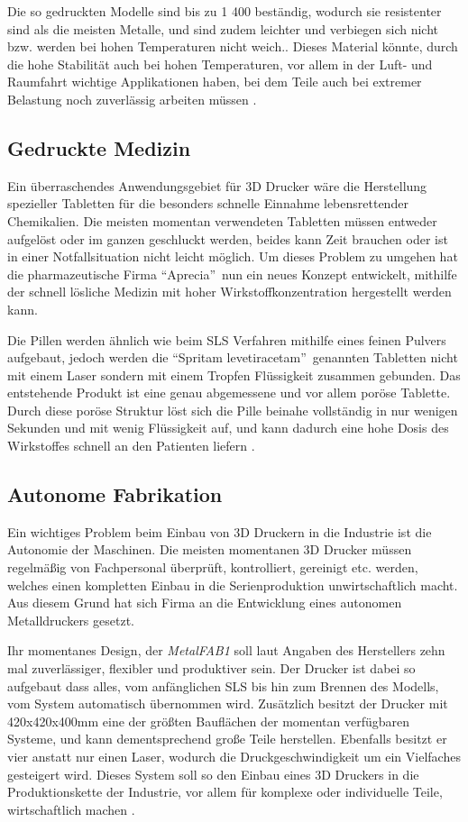 Die so gedruckten Modelle sind bis zu 1 400 \TEMP beständig, wodurch sie resistenter sind als die meisten Metalle, und sind zudem leichter und verbiegen sich nicht bzw. werden bei hohen Temperaturen nicht weich.. 
Dieses Material könnte, durch die hohe Stabilität auch bei hohen Temperaturen, vor allem in der Luft- und Raumfahrt wichtige Applikationen haben, bei dem Teile auch bei extremer Belastung noch zuverlässig arbeiten müssen \parencite{HiTempCeram}.



\subsection{Gedruckte Medizin}
Ein überraschendes Anwendungsgebiet für 3D Drucker wäre die Herstellung spezieller Tabletten für die besonders schnelle Einnahme lebensrettender Chemikalien. Die meisten momentan verwendeten Tabletten müssen entweder aufgelöst oder im ganzen geschluckt werden, beides kann Zeit brauchen oder ist in einer Notfallsituation nicht leicht möglich. Um dieses Problem zu umgehen hat die pharmazeutische Firma \textquotedblleft Aprecia\textquotedblright ~nun ein neues Konzept entwickelt, mithilfe der schnell lösliche Medizin mit hoher Wirkstoffkonzentration hergestellt werden kann.

Die Pillen werden ähnlich wie beim SLS Verfahren mithilfe eines feinen Pulvers aufgebaut, jedoch werden die \textquotedblleft Spritam levetiracetam\textquotedblright ~genannten Tabletten nicht mit einem Laser sondern mit einem Tropfen Flüssigkeit zusammen gebunden. Das entstehende Produkt ist eine genau abgemessene und vor allem poröse Tablette. Durch diese poröse Struktur löst sich die Pille beinahe vollständig in nur wenigen Sekunden und mit wenig Flüssigkeit auf, und kann dadurch eine hohe Dosis des Wirkstoffes schnell an den Patienten liefern \parencite{Printed_Drug}.

\subsection{Autonome Fabrikation}
Ein wichtiges Problem beim Einbau von 3D Druckern in die Industrie ist die Autonomie der Maschinen. Die meisten momentanen 3D Drucker müssen regelmäßig von Fachpersonal überprüft, kontrolliert, gereinigt etc. werden, welches einen kompletten Einbau in die Serienproduktion unwirtschaftlich macht. Aus diesem Grund hat sich Firma  an die Entwicklung eines autonomen Metalldruckers gesetzt. 

Ihr momentanes Design, der \emph{MetalFAB1} soll laut Angaben des Herstellers zehn mal zuverlässiger, flexibler und produktiver sein. Der Drucker ist dabei so aufgebaut dass alles, vom anfänglichen SLS bis hin zum Brennen des Modells, vom System automatisch übernommen wird. Zusätzlich besitzt der Drucker mit 420x420x400mm eine der größten Bauflächen der momentan verfügbaren Systeme, und kann dementsprechend große Teile herstellen. Ebenfalls besitzt er vier anstatt nur einen Laser, wodurch die Druckgeschwindigkeit um ein Vielfaches gesteigert wird.
Dieses System soll so den Einbau eines 3D Druckers in die Produktionskette der Industrie, vor allem für komplexe oder individuelle Teile, wirtschaftlich machen \parencite{MetalFAB}.